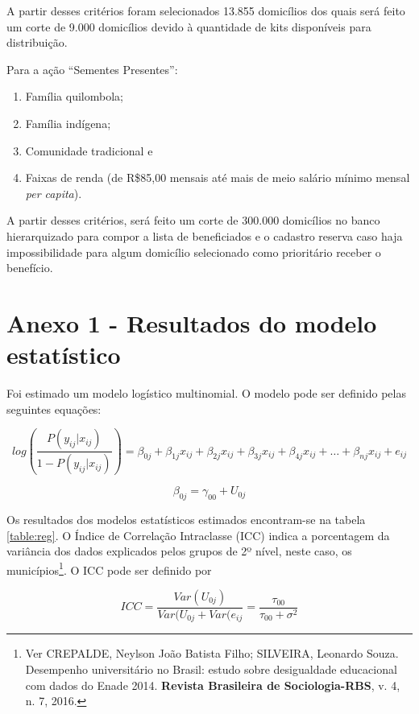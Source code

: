 \documentclass[a4paper, 12pt, openright, oneside, english, brazil, article]{abntex2}
\begin{document}
	A partir desses critérios foram selecionados 13.855 domicílios dos quais será feito um corte de 9.000 domicílios devido à quantidade de kits disponíveis para distribuição.

	Para a ação ``Sementes Presentes'':
	
	\begin{enumerate}
		\item Família quilombola;
		\item Família indígena;
		\item Comunidade tradicional e 
		\item Faixas de renda (de R\$85,00 mensais até mais de meio salário mínimo mensal \textit{per capita}).
	\end{enumerate}
	
	A partir desses critérios, será feito um corte de 300.000 domicílios no banco hierarquizado para compor a lista de beneficiados e o cadastro reserva caso haja impossibilidade para algum domicílio selecionado como prioritário receber o benefício.
	
	\newpage
	
	\postextual
	
	\anexos
	\section*{Anexo 1 - Resultados do modelo estatístico}
	
	Foi estimado um modelo logístico multinomial. O modelo pode ser definido pelas seguintes equações:
	
	$$log \left( \frac{P(y_{ij}|x_{ij})}{1-P(y_{ij}|x_{ij})} \right) = \beta_{0j} + \beta_{1j}x_{ij} + \beta_{2j}x_{ij} + \beta_{3j}x_{ij} + \beta_{4j}x_{ij} +  \dots  + \beta_{nj}x_{ij}  +  e_{ij} $$
	
	$$ \beta_{0j} = \gamma_{00} + U_{0j} $$
	
	Os resultados dos modelos estatísticos estimados encontram-se na tabela \ref{table:reg}. O Índice de Correlação Intraclasse (ICC) indica a porcentagem da variância dos dados explicados pelos grupos de 2º nível, neste caso, os municípios\footnote{Ver CREPALDE, Neylson João Batista Filho; SILVEIRA, Leonardo Souza. Desempenho universitário no Brasil: estudo sobre desigualdade educacional com dados do Enade 2014. \textbf{Revista Brasileira de Sociologia-RBS}, v. 4, n. 7, 2016.}. O ICC pode ser definido por
	
	$$ICC = \frac{Var(U_{0j})}{Var(U_{0j} + Var(e_{ij}} = \frac{\tau_{00}}{\tau_{00} + \sigma^2} $$
	
\end{document}
